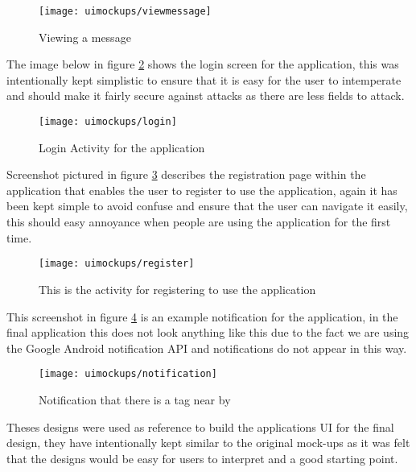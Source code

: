 \begin{figure}[H]
    \centering
    \texttt{[image: uimockups/viewmessage]}
    \caption{Viewing a message}
    \label{fig:viewing_message_image}
\end{figure} 

\noindent
The image below in figure \ref{fig:login_activity_image} shows the login screen for the application, this was intentionally kept simplistic to ensure that it is easy for the user to intemperate and should make it fairly secure against attacks as there are less fields to attack.\\

\begin{figure}[H]
    \centering
    \texttt{[image: uimockups/login]}
    \caption{Login Activity for the application}
    \label{fig:login_activity_image}
\end{figure} 

\noindent
Screenshot pictured in figure \ref{fig:registration_activity_image} describes the registration page within the application that enables the user to register to use the application, again it has been kept simple to avoid confuse and ensure that the user can navigate it easily, this should easy annoyance when people are using the application for the first time.\\

\begin{figure}[H]
    \centering
    \texttt{[image: uimockups/register]}
    \caption{This is the activity for registering to use the application}
    \label{fig:registration_activity_image}
\end{figure} 

\noindent
This screenshot in figure \ref{fig:notification_image} is an example notification for the application, in the final application this does not look anything like this due to the fact we are using the Google Android notification API and notifications do not appear in this way.\\

\begin{figure}[H]
    \centering
    \texttt{[image: uimockups/notification]}
    \caption{Notification that there is a tag near by}
    \label{fig:notification_image}
\end{figure} 

\noindent
Theses designs were used as reference to build the applications UI for the final design, they have intentionally kept similar to the original mock-ups as it was felt that the designs would be easy for users to interpret and a good starting point.\\

